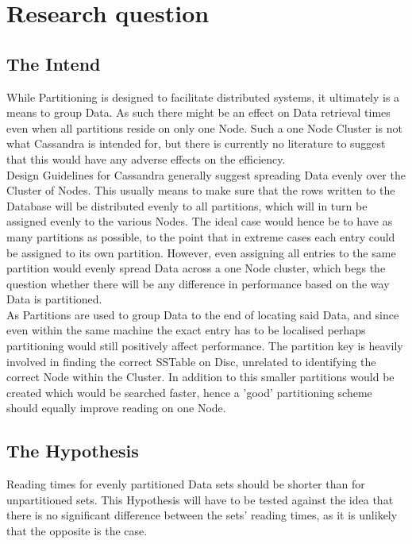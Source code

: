 \documentclass{template/csfourzero}
\begin{document}
\section{Research question} %
\label{sec:rq}
  
  \subsection{The Intend}
  While Partitioning is designed to facilitate distributed systems, it ultimately is a means to group Data. As such there might be an effect on Data retrieval times even when all partitions reside on only one Node. Such a one Node Cluster is not what Cassandra is intended for, but there is currently no literature to suggest that this would have any adverse effects on the efficiency.
  \\
  Design Guidelines for Cassandra generally suggest spreading Data evenly over the Cluster of Nodes.\cite{cassandraBasics,sherman} This usually means to make sure that the rows written to the Database will be distributed evenly to all partitions, which will in turn be assigned evenly to the various Nodes. The ideal case would hence be to have as many partitions as possible, to the point that in extreme cases each entry could be assigned to its own partition. \cite{cassandraBasics} However, even assigning all entries to the same partition would evenly spread Data across a one Node cluster, which begs the question whether there will be any difference in performance based on the way Data is partitioned.
  \\
  As Partitions are used to group Data to the end of locating said Data, and since even within the same machine the exact entry has to be localised perhaps partitioning would still positively affect performance. The partition key is heavily involved in finding the correct SSTable on Disc, unrelated to identifying the correct Node within the Cluster. \cite{cassandraRead} In addition to this smaller partitions would be created which would be searched faster, hence a 'good' partitioning scheme should equally improve reading on one Node. 
  \\
  \subsection{The Hypothesis}
  Reading times for evenly partitioned Data sets should be shorter than for unpartitioned sets. This Hypothesis will have to be tested against the idea that there is no significant difference between the sets' reading times, as it is unlikely that the opposite is the case.
  
\end{document}
